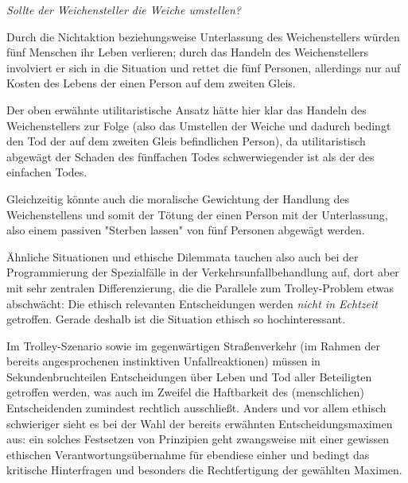 \documentclass[twocolumn, german]{tum-article}
\begin{document}
\emph{Sollte der Weichensteller die Weiche umstellen?}

Durch die Nichtaktion beziehungsweise Unterlassung des Weichenstellers würden fünf Menschen ihr Leben verlieren; durch das Handeln des Weichenstellers involviert er sich in die Situation und rettet die fünf Personen, allerdings nur auf Kosten des Lebens der einen Person auf dem zweiten Gleis.

Der oben erwähnte utilitaristische Ansatz hätte hier klar das Handeln des Weichenstellers zur Folge (also das Umstellen der Weiche und dadurch bedingt den Tod der auf dem zweiten Gleis befindlichen Person), da utilitaristisch abgewägt der Schaden des fünffachen Todes schwerwiegender ist als der des einfachen Todes.

Gleichzeitig könnte auch die moralische Gewichtung der Handlung des Weichenstellens und somit der Tötung der einen Person mit der Unterlassung, also einem passiven "Sterben lassen" von fünf Personen abgewägt werden.

Ähnliche Situationen und ethische Dilemmata tauchen also auch bei der Programmierung der Spezialfälle in der Verkehrsunfallbehandlung auf, dort aber mit sehr zentralen Differenzierung, die die Parallele zum Trolley-Problem etwas abschwächt:
Die ethisch relevanten Entscheidungen werden \textit{nicht in Echtzeit} getroffen. Gerade deshalb ist die Situation ethisch so hochinteressant.

Im Trolley-Szenario sowie im gegenwärtigen Straßenverkehr (im Rahmen der bereits angesprochenen instinktiven Unfallreaktionen) müssen in Sekundenbruchteilen Entscheidungen über Leben und Tod aller Beteiligten getroffen werden, was auch im Zweifel die Haftbarkeit des (menschlichen) Entscheidenden zumindest rechtlich ausschließt.
Anders und vor allem ethisch schwieriger sieht es bei der Wahl der bereits erwähnten Entscheidungsmaximen aus: ein solches Festsetzen von Prinzipien geht zwangsweise mit einer gewissen ethischen Verantwortungsübernahme für ebendiese einher und bedingt das kritische Hinterfragen und besonders die Rechtfertigung der gewählten Maximen.
\end{document}
